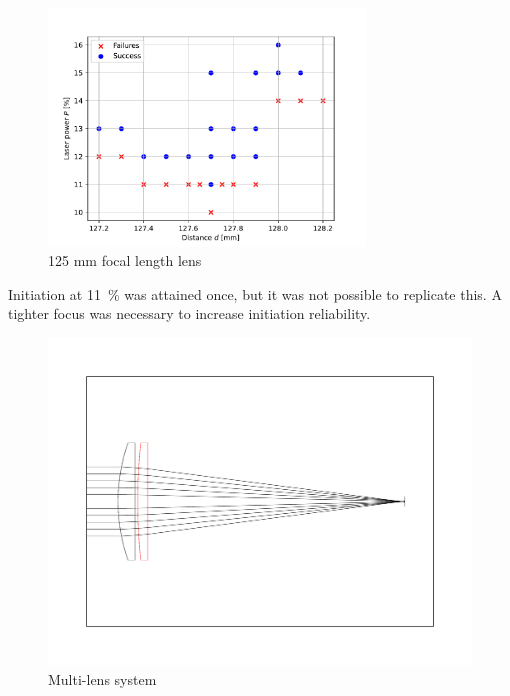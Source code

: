         \begin{figure}[!ht]
            \centering
            \includegraphics[width=0.75\textwidth]{assets/4 experiments/125mm_focus_threshold.pdf}
            \caption{125 mm focal length lens}
        \end{figure}
        
        Initiation at \qty{11}{\%} was attained once, but it was not possible to replicate this. A tighter focus was necessary to increase initiation reliability.

        \begin{figure}[!ht]
            \centering
            \includegraphics[width=\textwidth]{assets/4 experiments/500 and 150 lenses.pdf}
            \caption{Multi-lens system}
        \end{figure}


